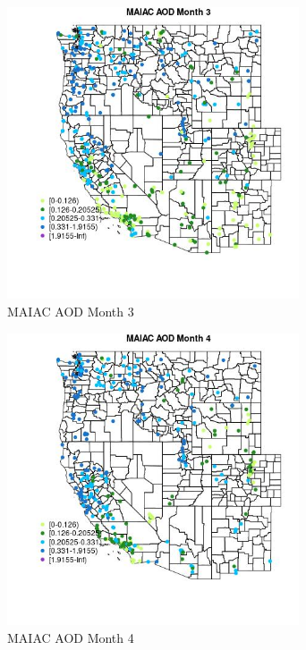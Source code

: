 \begin{figure} 
\centering  
\includegraphics[width=0.77\textwidth]{Code_Outputs/Report_ML_input_PM25_Step4_part_e_de_duplicated_aves_compiled_2019-05-18wNAs_MapObsMo3MAIAC_AOD.jpg} 
\caption{\label{fig:Report_ML_input_PM25_Step4_part_e_de_duplicated_aves_compiled_2019-05-18wNAsMapObsMo3MAIAC_AOD}MAIAC AOD Month 3} 
\end{figure} 
 

\begin{figure} 
\centering  
\includegraphics[width=0.77\textwidth]{Code_Outputs/Report_ML_input_PM25_Step4_part_e_de_duplicated_aves_compiled_2019-05-18wNAs_MapObsMo4MAIAC_AOD.jpg} 
\caption{\label{fig:Report_ML_input_PM25_Step4_part_e_de_duplicated_aves_compiled_2019-05-18wNAsMapObsMo4MAIAC_AOD}MAIAC AOD Month 4} 
\end{figure} 
 

